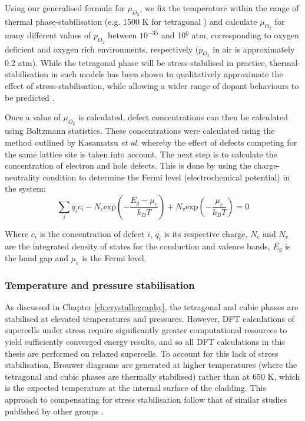 Using our generalised formula for $\mu_{O_2}$, we fix the temperature within the range of thermal phase-stabilisation (e.g. 1500 K for tetragonal \zirconia) and calculate $\mu_{O_2}$ for many different values of $p_{O_2}$ between $10^{-35}$ and 10$^{0}$ atm, corresponding to oxygen deficient and oxygen rich environments, respectively ($p_{O_2}$ in air is approximately 0.2 atm). While the tetragonal phase will be stress-stabilised in practice, thermal-stabilisation in such models has been shown to qualitatively approximate the effect of stress-stabilisation, while allowing a wider range of dopant behaviours to be predicted \cite{Bell2016}. 

Once a value of $\mu_{O_2}$ is calculated, defect concentrations can then be calculated using Boltzmann statistics. These concentrations were calculated using the method outlined by Kasamatsu \emph{et al}. \cite{Kasamatsu2012} whereby the effect of defects competing for the same lattice site is taken into account. The next step is to calculate the concentration of electron and hole defects. This is done by using the charge-neutrality condition to determine the Fermi level (electrochemical potential) in the system:
\begin{equation}
\sum_{i}q_{i}c_{i} - N_{c}\textrm{exp}{(-\frac{E_{g}-\mu_{e}}{k_{B}T})} + N_{v}\textrm{exp}{(-\frac{\mu_{e}}{k_{B}T})} = 0
\label{charge_neutrality}
\end{equation}

Where $c_{i}$ is the concentration of defect $i$, $q_{i}$ is its respective charge, $N_{c}$ and $N_{v}$ are the integrated density of states for the conduction and valence bands, $E_{g}$ is the band gap and $\mu_{e}$ is the Fermi level. 

\subsubsection{Temperature and pressure stabilisation}

As discussed in Chapter \ref{ch:crystallography}, the tetragonal and cubic phases are stabilised at elevated temperatures and pressures. However, DFT calculations of supercells under stress require significantly greater computational resources to yield sufficiently converged energy results, and so all DFT calculations in this thesis are performed on relaxed supercells. To account for this lack of stress stabilisation, Brouwer diagrams are generated at higher temperatures (where the tetragonal and cubic phases are thermally stabilised) rather than at 650 K, which is the expected temperature at the internal surface of the cladding. This approach to compensating for stress stabilisation follow that of similar studies published by other groups \cite{youssef2012intrinsic, Youssef2014, Otgonbaatar2014}.

